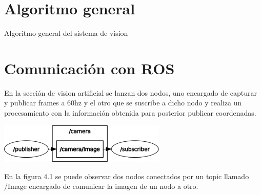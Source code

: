 \section{Algoritmo general}
\begin{algorithm}
	\caption{Algoritmo general del sistema de vision}
	\begin{algorithmic}[1]
	\end{algorithmic}
\end{algorithm}




\section{Comunicación con ROS}
En la sección de vision artificial se lanzan dos nodos, uno encargado de capturar y
publicar frames a 60hz y el otro que se suscribe a dicho nodo y realiza un procesamiento
con la información obtenida para posterior publicar coordenadas.
\begin{center}
	\includegraphics[width=0.6\textwidth]{Contenido/Cuerpo/Capitulo4/Fig0.eps}
	\label{Fig1}
\end{center}
En la figura 4.1 se puede observar dos nodos conectados por un topic llamado /Image
encargado de comunicar la imagen de un nodo a otro.
